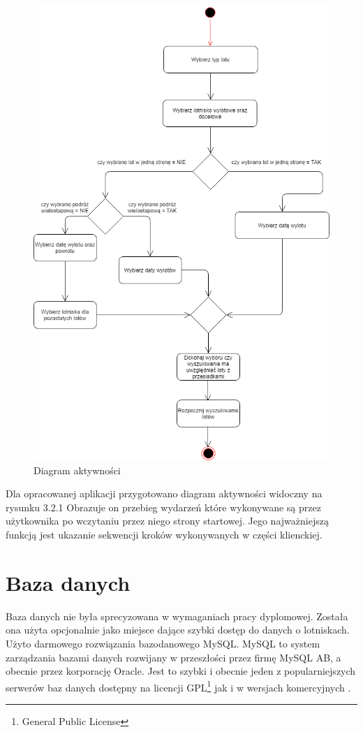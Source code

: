\documentclass[12pt, twoside]{report}
\begin{document}
\begin{figure}[!ht]
\centering
\includegraphics[scale=0.56, keepaspectratio]{activity_diagram.png}
\caption{Diagram aktywności}
\label{fig:architecure_diagram}
\end{figure}
Dla opracowanej aplikacji przygotowano diagram aktywności widoczny na rysunku 3.2.1 Obrazuje on przebieg wydarzeń które wykonywane są przez użytkownika po wczytaniu przez niego strony startowej. Jego najważniejszą funkcją jest ukazanie sekwencji kroków wykonywanych w części klienckiej.
\newpage
\section{Baza danych}
Baza danych nie była sprecyzowana w wymaganiach pracy dyplomowej. Została ona użyta opcjonalnie jako miejsce dające szybki dostęp do danych o lotniskach. Użyto darmowego rozwiązania bazodanowego MySQL. MySQL to system zarządzania bazami danych rozwijany w przeszłości przez firmę MySQL AB, a obecnie przez korporację Oracle. Jest to szybki i obecnie jeden z popularniejszych serwerów baz danych dostępny na licencji GPL\footnote{General Public License} jak i w wersjach komercyjnych \cite{mysql}.
\end{document}
